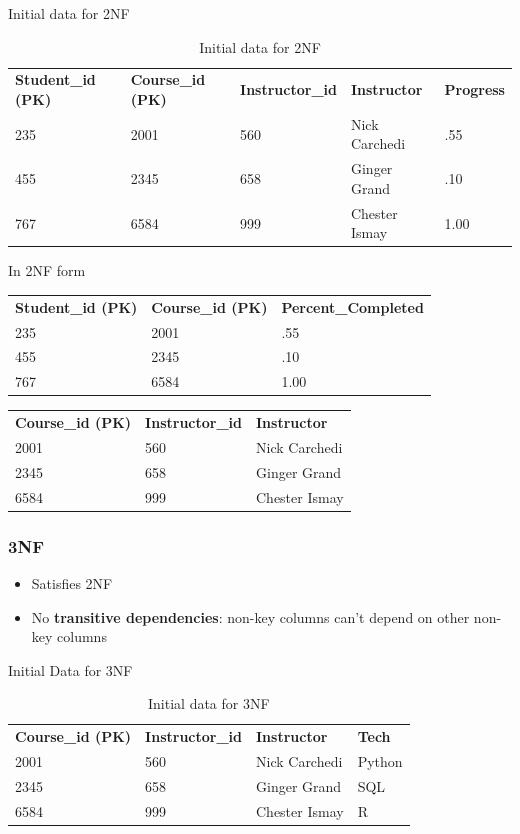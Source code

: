 Initial data for 2NF
\begin{table}[H]
    \caption{Initial data for 2NF}
    \label{tab:InitialData42NF}
    \begin{tabular}{lllll}
        \textbf{Student\_id (PK)} & \textbf{Course\_id (PK)} & \textbf{Instructor\_id} & \textbf{Instructor} & \textbf{Progress} \\
        235 & 2001 & 560 & Nick Carchedi & .55 \\
        455 & 2345 & 658 & Ginger Grand & .10\\
        767 & 6584 & 999 & Chester Ismay & 1.00
    \end{tabular}
\end{table}

In 2NF form
\begin{table}[H]
    \begin{tabular}{lll}
        \textbf{Student\_id (PK)} & \textbf{Course\_id (PK)} & \textbf{Percent\_Completed} \\
        235 & 2001 & .55 \\
        455 & 2345 & .10 \\
        767 & 6584 & 1.00 \\
    \end{tabular}
\end{table}

\begin{table}[H]
    \begin{tabular}{lll}
        \textbf{Course\_id (PK)} & \textbf{Instructor\_id} & \textbf{Instructor} \\
        2001 & 560 & Nick Carchedi \\
        2345 & 658 & Ginger Grand \\
        6584 & 999 & Chester Ismay
    \end{tabular}
\end{table}

\subsubsection{3NF}
\begin{itemize}
    \item Satisfies 2NF
    \item No \textbf{transitive dependencies}: non-key columns can't depend on other non-key columns
\end{itemize}

Initial Data for 3NF
\begin{table}[H]
    \caption{Initial data for 3NF}
    \label{tab:InitailData43NF}
    \begin{tabular}{llll}
        \textbf{Course\_id (PK)} & \textbf{Instructor\_id} & \textbf{Instructor} & \textbf{Tech} \\
        2001 & 560 & Nick Carchedi & Python \\
        2345 & 658 & Ginger Grand & SQL \\
        6584 & 999 & Chester Ismay & R
    \end{tabular}
\end{table}

